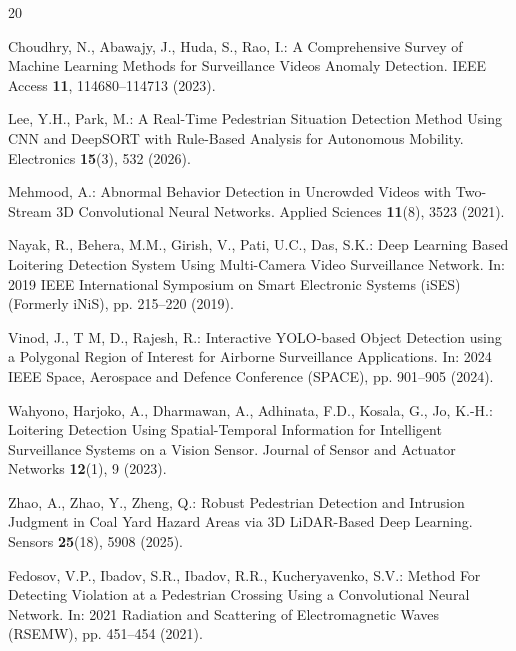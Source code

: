 \documentclass[runningheads]{llncs}
\begin{document}
%
%
%
% 
% 
%
\begin{thebibliography}{20}

Choudhry, N., Abawajy, J., Huda, S., Rao, I.: A Comprehensive Survey of Machine Learning Methods for Surveillance Videos Anomaly Detection. IEEE Access \textbf{11}, 114680--114713 (2023). 

Lee, Y.H., Park, M.: A Real-Time Pedestrian Situation Detection Method Using CNN and DeepSORT with Rule-Based Analysis for Autonomous Mobility. Electronics \textbf{15}(3), 532 (2026). 

Mehmood, A.: Abnormal Behavior Detection in Uncrowded Videos with Two-Stream 3D Convolutional Neural Networks. Applied Sciences \textbf{11}(8), 3523 (2021). 

Nayak, R., Behera, M.M., Girish, V., Pati, U.C., Das, S.K.: Deep Learning Based Loitering Detection System Using Multi-Camera Video Surveillance Network. In: 2019 IEEE International Symposium on Smart Electronic Systems (iSES) (Formerly iNiS), pp. 215--220 (2019). 

Vinod, J., T M, D., Rajesh, R.: Interactive YOLO-based Object Detection using a Polygonal Region of Interest for Airborne Surveillance Applications. In: 2024 IEEE Space, Aerospace and Defence Conference (SPACE), pp. 901--905 (2024). 

Wahyono, Harjoko, A., Dharmawan, A., Adhinata, F.D., Kosala, G., Jo, K.-H.: Loitering Detection Using Spatial-Temporal Information for Intelligent Surveillance Systems on a Vision Sensor. Journal of Sensor and Actuator Networks \textbf{12}(1), 9 (2023). 

Zhao, A., Zhao, Y., Zheng, Q.: Robust Pedestrian Detection and Intrusion Judgment in Coal Yard Hazard Areas via 3D LiDAR-Based Deep Learning. Sensors \textbf{25}(18), 5908 (2025). 

Fedosov, V.P., Ibadov, S.R., Ibadov, R.R., Kucheryavenko, S.V.: Method For Detecting Violation at a Pedestrian Crossing Using a Convolutional Neural Network. In: 2021 Radiation and Scattering of Electromagnetic Waves (RSEMW), pp. 451--454 (2021). 


\end{thebibliography}
\end{document}
